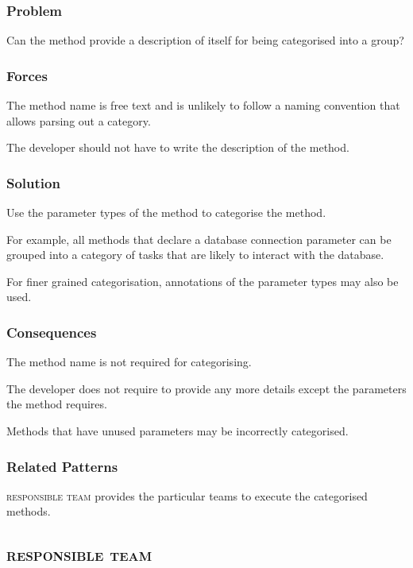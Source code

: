 \documentclass[prodmode]{style/acmlarge}
\begin{document}
\subsubsection*{Problem}

Can the method provide a description of itself for being categorised into a group?

\subsubsection*{Forces}

The method name is free text and is unlikely to follow a naming convention that
allows parsing out a category.

The developer should not have to write the description of the method.

\subsubsection*{Solution}

Use the parameter types of the method to categorise the method.

For example, all methods that declare a database connection parameter can be
grouped into a category of tasks that are likely to interact with the database.

For finer grained categorisation, annotations of the parameter types may also be
used.

\subsubsection*{Consequences}

The method name is not required for categorising.

The developer does not require to provide any more details except the parameters
the method requires.

Methods that have unused parameters may be incorrectly categorised.

\subsubsection*{Related Patterns}

\textsc{responsible team} provides the particular teams to execute the categorised methods.



\subsection{\textsc{\textbf{responsible team}}}
\end{document}

